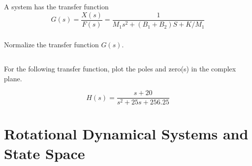 \documentclass{article}	%
\begin{document}
\subsection{}
 A system has the transfer function
\[
G(s) =  \frac{X(s)}{F(s)} = \frac{1}{M_1s^2+(B_1+B_2)S + K/M_1}
\]

\subsubsection{}
Normalize the transfer function $G(s)$.

%
%
%
%
%

\subsection{} For the following transfer function, plot the poles and zero(s) in the complex plane.

\[
H(s) = \frac   {s+20}  {s^2 + 25s + 256.25}
\]

%
%
%
%
%






\newpage
\section{Rotational Dynamical Systems and State Space}
\end{document}
